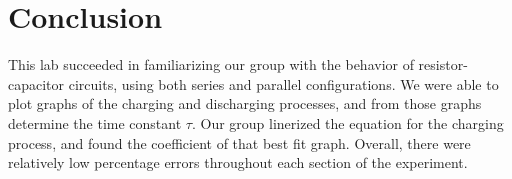 \documentclass[titlepage]{article}
\begin{document}
	\section{Conclusion}
    This lab succeeded in familiarizing our group with the behavior of resistor-capacitor circuits, using both series and parallel configurations.  We were able to plot graphs of the charging and discharging processes, and from those graphs determine the time constant $\tau$. Our group linerized the equation for the charging process, and found the coefficient of that best fit graph. Overall, there were relatively low percentage errors throughout each section of the experiment.
\end{document}
